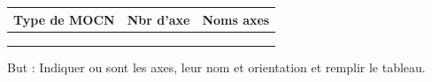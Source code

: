 \documentclass[
	11pt, %
	fleqn, %
	a4paper, %
]{LegrandOrangeBook}
\begin{document}
\begin{table}[H] %
	\centering %
	\begin{tabular}{L{0.15\textwidth} R{0.15\textwidth} R{0.15\textwidth}} %
		\toprule
		\textbf{Type de MOCN} & \textbf{Nbr d'axe} & \textbf{Noms axes}\\
		\midrule
		  &  &  \\
		  &  &  \\
		  &  &  \\
		\bottomrule
	\end{tabular}
	\label{Z12} %
\end{table}






But : Indiquer ou sont les axes, leur nom et orientation et remplir le tableau.
\begin{figure}[H] %
	\centering %
	\label{Exo_2} %
\end{figure}
\end{document}
